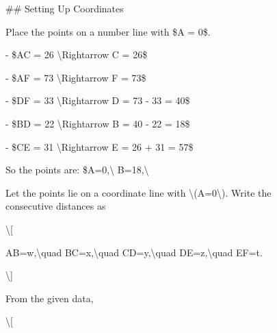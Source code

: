 \begin{figure}[H]
\begin{answercol}[equal height group=ansX0]
  \caret{}\par\vspace{4pt}
  \raggedright \#\# Setting Up Coordinates\par\vspace{2pt}
  Place the points on a number line with \$A = 0\$.\par\vspace{2pt}
  - \$AC = 26 \textbackslash{}Rightarrow C = 26\$\par\vspace{2pt}
  - \$AF = 73 \textbackslash{}Rightarrow F = 73\$\par\vspace{2pt}
  - \$DF = 33 \textbackslash{}Rightarrow D = 73 - 33 = 40\$\par\vspace{2pt}
  - \$BD = 22 \textbackslash{}Rightarrow B = 40 - 22 = 18\$\par\vspace{2pt}
  - \$CE = 31 \textbackslash{}Rightarrow E = 26 + 31 = 57\$\par\vspace{2pt}
  So the points are: \$A=0,\textbackslash{} B=18,\textbackslash{}\par\vspace{3pt}\elide
\end{answercol}\hspace{\columnsep}%
\begin{answercol}[equal height group=ansX0]
  \caret{}\par\vspace{4pt}
  \raggedright Let the points lie on a coordinate line with \textbackslash{}(A=0\textbackslash{}). Write the consecutive distances as\par\vspace{2pt}
  \textbackslash{}[\par\vspace{2pt}
  AB=w,\textbackslash{}quad BC=x,\textbackslash{}quad CD=y,\textbackslash{}quad DE=z,\textbackslash{}quad EF=t.\par\vspace{2pt}
  \textbackslash{}]\par\vspace{2pt}
  From the given data,\par\vspace{2pt}
  \textbackslash{}[\par\vspace{2pt}

\end{answercol}
\end{figure}
